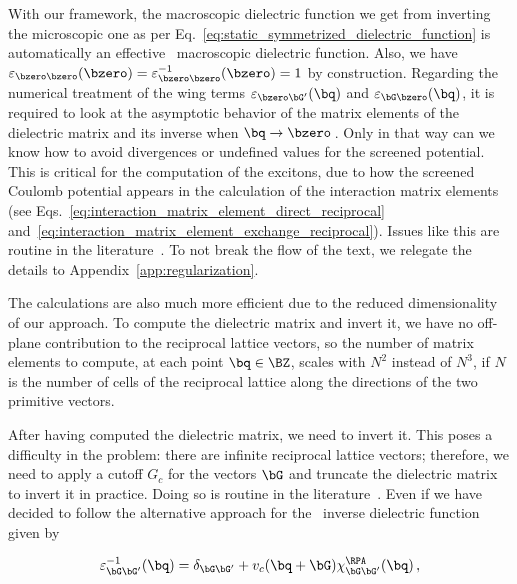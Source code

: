 With our framework, the macroscopic dielectric function we get from inverting the microscopic one as per Eq.~\eqref{eq:static_symmetrized_dielectric_function} is automatically an effective \bd~macroscopic dielectric function.
Also, we have $\varepsilon_{\bzero \bzero} (\bzero) = \varepsilon^{-1}_{\bzero \bzero} (\bzero) = 1$ by construction.
Regarding the numerical treatment of the wing terms $\varepsilon_{\bzero \bG'} (\bq)$ and $\varepsilon_{\bG \bzero} (\bq)$, it is required to look at the asymptotic behavior of the matrix elements of the dielectric matrix and its inverse when $\bq \to \bzero$\,.
Only in that way can we know how to avoid divergences or undefined values for the screened potential.
This is critical for the computation of the excitons, due to how the screened Coulomb potential appears in the calculation of the interaction matrix elements (see Eqs.~\eqref{eq:interaction_matrix_element_direct_reciprocal} and~\eqref{eq:interaction_matrix_element_exchange_reciprocal}).
Issues like this are routine in the literature~\cite{BerkeleyGW,Louie_2000,Rasmussen_Schmidt_Winther_Thygesen_2016,Guandalini_Varsano_2023}.
To not break the flow of the text, we relegate the details to Appendix~\ref{app:regularization}.

The calculations are also much more efficient due to the reduced dimensionality of our approach.
To compute the dielectric matrix and invert it, we have no off-plane contribution to the reciprocal lattice vectors, so the number of matrix elements to compute, at each point $\bq \in \BZ$, scales with $N^2$ instead of $N^3$, if $N$ is the number of cells of the reciprocal lattice along the directions of the two primitive vectors.

After having computed the dielectric matrix, we need to invert it.
This poses a difficulty in the problem: there are infinite reciprocal lattice vectors; therefore, we need to apply a cutoff $G_c$ for the vectors $\bG$ and truncate the dielectric matrix to invert it in practice.
Doing so is routine in the literature~\cite{BerkeleyGW,GPAW_2025,Yambo_2009}.
Even if we have decided to follow the alternative approach for the \rpa~inverse dielectric function given by~\cite{Dielectric_Genome}

\begin{equation}
    \label{eq:inverse_dielectric_function_alternative}
    \varepsilon^{-1}_{\bG \bG'} (\bq) = \delta_{\bG \bG'} + v_c(\bq + \bG) \chi^{\RPA}_{\bG \bG'} (\bq) \,,
\end{equation}

